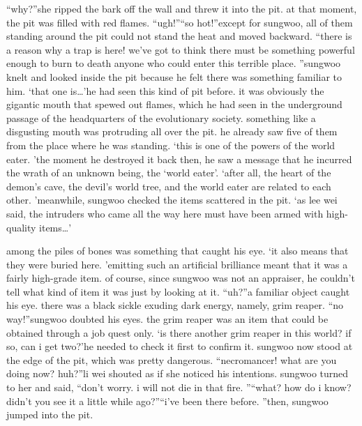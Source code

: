 “why?”she ripped the bark off the wall and threw it into the pit.
at that moment, the pit was filled with red flames.
“ugh!”“so hot!”except for sungwoo, all of them standing around the pit could not stand the heat and moved backward.
“there is a reason why a trap is here! we’ve got to think there must be something powerful enough to burn to death anyone who could enter this terrible place.
”sungwoo knelt and looked inside the pit because he felt there was something familiar to him.
‘that one is…’he had seen this kind of pit before.
 it was obviously the gigantic mouth that spewed out flames, which he had seen in the underground passage of the headquarters of the evolutionary society.
something like a disgusting mouth was protruding all over the pit.
 he already saw five of them from the place where he was standing.
‘this is one of the powers of the world eater.
’the moment he destroyed it back then, he saw a message that he incurred the wrath of an unknown being, the ‘world eater’.
‘after all, the heart of the demon’s cave, the devil’s world tree, and the world eater are related to each other.
’meanwhile, sungwoo checked the items scattered in the pit.
‘as lee wei said, the intruders who came all the way here must have been armed with high-quality items…’

among the piles of bones was something that caught his eye.
‘it also means that they were buried here.
’emitting such an artificial brilliance meant that it was a fairly high-grade item.
of course, since sungwoo was not an appraiser, he couldn’t tell what kind of item it was just by looking at it.
“uh?”a familiar object caught his eye.
 there was a black sickle exuding dark energy, namely, grim reaper.
“no way!”sungwoo doubted his eyes.
 the grim reaper was an item that could be obtained through a job quest only.
‘is there another grim reaper in this world? if so, can i get two?’he needed to check it first to confirm it.
 sungwoo now stood at the edge of the pit, which was pretty dangerous.
“necromancer! what are you doing now? huh?”li wei shouted as if she noticed his intentions.
sungwoo turned to her and said, “don’t worry.
 i will not die in that fire.
”“what? how do i know? didn’t you see it a little while ago?”“i’ve been there before.
”then, sungwoo jumped into the pit.


 